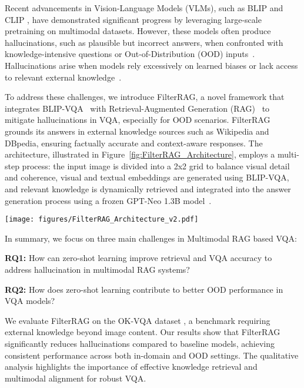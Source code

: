 Recent advancements in Vision-Language Models (VLMs), such as BLIP \cite{li2022blip} and CLIP \cite{radford2021learning}, have demonstrated significant progress by leveraging large-scale pretraining on multimodal datasets. However, these models often produce hallucinations, such as plausible but incorrect answers, when confronted with knowledge-intensive questions or Out-of-Distribution (OOD) inputs~\cite{jiang2024negative, zang2024overcoming, bordes2024introduction}. Hallucinations arise when models rely excessively on learned biases or lack access to relevant external knowledge~\cite{radford2021learning, jia2021scaling}.

To address these challenges, we introduce FilterRAG, a novel framework that integrates BLIP-VQA~\cite{li2022blip} with Retrieval-Augmented Generation (RAG)~\cite{lewis2020retrieval, ram2023context, karpukhin2020dense} to mitigate hallucinations in VQA, especially for OOD scenarios. FilterRAG grounds its answers in external knowledge sources such as Wikipedia and DBpedia, ensuring factually accurate and context-aware responses. The architecture, illustrated in Figure~\ref{fig:FilterRAG_Architecture}, employs a multi-step process: the input image is divided into a 2x2 grid to balance visual detail and coherence, visual and textual embeddings are generated using BLIP-VQA, and relevant knowledge is dynamically retrieved and integrated into the answer generation process using a frozen GPT-Neo 1.3B model~\cite{gpt-neo}.

\begin{figure*}[t]
    \centering
    \texttt{[image: figures/FilterRAG\_Architecture\_v2.pdf]}
    \caption{The \textbf{FilterRAG} architecture: A step-by-step process integrating frozen \textbf{BLIP-VQA} with \textbf{Retrieval-Augmented Generation (RAG)}. The system retrieves knowledge from Wikipedia and DBpedia, augments image-question pairs, and uses frozen \textbf{GPT-Neo 1.3B} to generate answers.}
    \label{fig:FilterRAG_Architecture}
\end{figure*}

In summary, we focus on three main challenges in Multimodal RAG based VQA:

\textbf{RQ1:} How can zero-shot learning improve retrieval and VQA accuracy to address hallucination in multimodal RAG systems?

\textbf{RQ2:} How does zero-shot learning contribute to better OOD performance in VQA models?

We evaluate FilterRAG on the OK-VQA dataset \cite{marino2019ok}, a benchmark requiring external knowledge beyond image content. Our results show that FilterRAG significantly reduces hallucinations compared to baseline models, achieving consistent performance across both in-domain and OOD settings. The qualitative analysis highlights the importance of effective knowledge retrieval and multimodal alignment for robust VQA.

